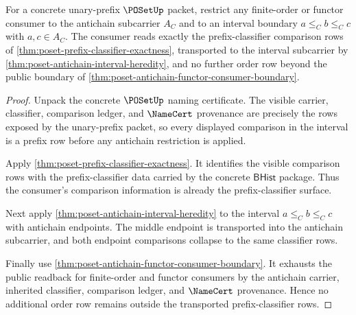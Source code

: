 \begin{theorem}
\label{thm:poset-antichain-interval-consumer-exactness}
For a concrete unary-prefix $\POSetUp$ packet, restrict any finite-order or
functor consumer to the antichain subcarrier $A_C$ and to an interval boundary
$a\le_C b\le_C c$ with $a,c\in A_C$. The consumer reads exactly the
prefix-classifier comparison rows of
\autoref{thm:poset-prefix-classifier-exactness}, transported to the interval
subcarrier by \autoref{thm:poset-antichain-interval-heredity}, and no further
order row beyond the public boundary of
\autoref{thm:poset-antichain-functor-consumer-boundary}.
\end{theorem}
\begin{proof}
Unpack the concrete $\POSetUp$ naming certificate. The visible carrier,
classifier, comparison ledger, and $\NameCert$ provenance are precisely the
rows exposed by the unary-prefix packet, so every displayed comparison in the
interval is a prefix row before any antichain restriction is applied.

Apply \autoref{thm:poset-prefix-classifier-exactness}. It identifies the
visible comparison rows with the prefix-classifier data carried by the concrete
$\mathsf{BHist}$ package. Thus the consumer's comparison information is already
the prefix-classifier surface.

Next apply \autoref{thm:poset-antichain-interval-heredity} to the interval
$a\le_C b\le_C c$ with antichain endpoints. The middle endpoint is transported
into the antichain subcarrier, and both endpoint comparisons collapse to the
same classifier rows.

Finally use \autoref{thm:poset-antichain-functor-consumer-boundary}. It
exhausts the public readback for finite-order and functor consumers by the
antichain carrier, inherited classifier, comparison ledger, and $\NameCert$
provenance. Hence no additional order row remains outside the transported
prefix-classifier rows.
\end{proof}

